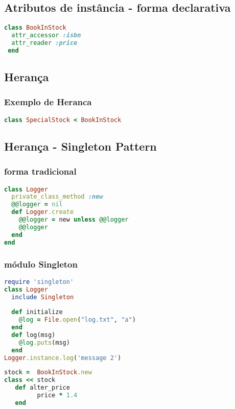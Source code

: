 \documentclass[serif,mathserif]{article}
\begin{document}
\subsection{Atributos de instância - forma declarativa}
\begin{lstlisting}[language=ruby]
class BookInStock  
  attr_accessor :isbn
  attr_reader :price
 end
\end{lstlisting}

\subsection{Herança}
\subsubsection{Exemplo de Heranca}
\begin{lstlisting}[language=ruby]
class SpecialStock < BookInStock
\end{lstlisting}

\subsection{Herança - Singleton Pattern}

\subsubsection{forma tradicional}
\begin{lstlisting}[language=ruby]
class Logger
  private_class_method :new
  @@logger = nil
  def Logger.create
    @@logger = new unless @@logger
    @@logger
  end
end
\end{lstlisting}

\subsubsection{módulo Singleton}
\begin{lstlisting}[language=ruby]
require 'singleton'
class Logger
  include Singleton
  
  def initialize
    @log = File.open("log.txt", "a")
  end
  def log(msg)
    @log.puts(msg)
  end
Logger.instance.log('message 2')
\end{lstlisting}

\begin{lstlisting}[language=ruby]
stock =  BookInStock.new
class << stock
   def alter_price
         price * 1.4
   end
\end{lstlisting}
\end{document}

